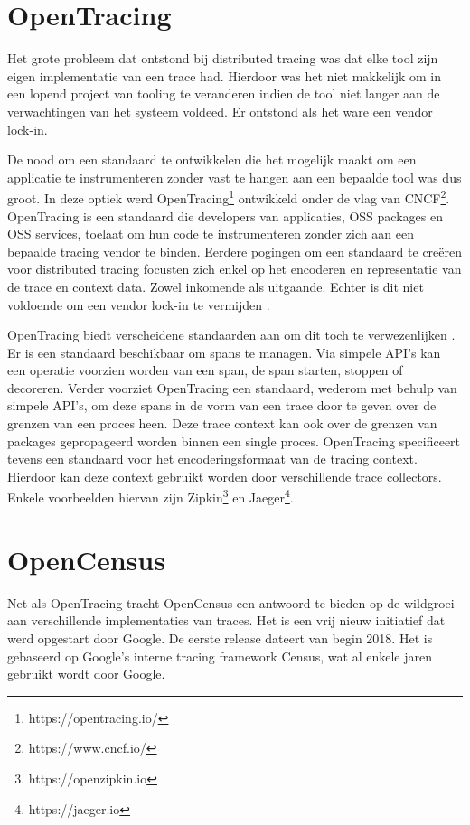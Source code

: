 \section{OpenTracing}
Het grote probleem dat ontstond bij distributed tracing was dat elke tool zijn eigen implementatie van een trace had. Hierdoor was het niet makkelijk om in een lopend project van tooling te veranderen indien de tool niet langer aan de verwachtingen van het systeem voldeed. Er ontstond als het ware een \gls{vendor lock-in}.

De nood om een standaard te ontwikkelen die het mogelijk maakt om een applicatie te instrumenteren zonder vast te hangen aan een bepaalde tool was dus groot. In deze optiek werd OpenTracing\footnote{https://opentracing.io/} ontwikkeld onder de vlag van \gls{CNCF}\footnote{https://www.cncf.io/}. OpenTracing is een standaard die developers van applicaties, \gls{OSS} packages en \gls{OSS} services, toelaat om hun code te instrumenteren zonder zich aan een bepaalde tracing vendor te binden. Eerdere pogingen om een standaard te creëren voor distributed tracing focusten zich enkel op het encoderen en representatie van de trace en context data. Zowel inkomende als uitgaande. Echter is dit niet voldoende om een \gls{vendor lock-in} te vermijden \autocite{Sigelman2016}.

OpenTracing biedt verscheidene standaarden aan om dit toch te verwezenlijken \autocite{Sigelman2016}. Er is een standaard beschikbaar om spans te managen. Via simpele \gls{API}'s kan een operatie voorzien worden van een span, de span starten, stoppen of \gls{decoreren}. Verder voorziet OpenTracing een standaard, wederom met behulp van simpele \gls{API}'s, om deze spans in de vorm van een trace door te geven over de grenzen van een proces heen. Deze trace context kan ook over de grenzen van packages gepropageerd worden binnen een single proces. OpenTracing specificeert tevens een standaard voor het encoderingsformaat van de tracing context. Hierdoor kan deze context gebruikt worden door verschillende trace collectors. Enkele voorbeelden hiervan zijn Zipkin\footnote{https://openzipkin.io} en Jaeger\footnote{https://jaeger.io}.

\section{OpenCensus}
Net als OpenTracing tracht OpenCensus een antwoord te bieden op de wildgroei aan verschillende implementaties van traces. Het is een vrij nieuw initiatief dat werd opgestart door Google. De eerste release dateert van begin 2018. Het is gebaseerd op Google's interne tracing framework Census, wat al enkele jaren gebruikt wordt door Google.

